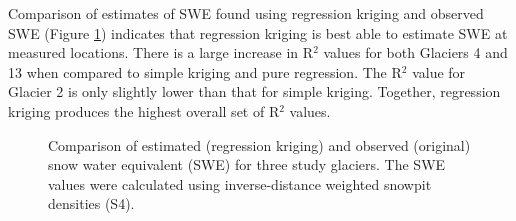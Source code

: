\documentclass[12pt]{article}
\begin{document}
Comparison of estimates of SWE found using regression kriging and observed SWE (Figure \ref{fig:R2regressionkrig}) indicates that regression kriging is best able to estimate SWE at measured locations. There is a large increase in R$^2$ values for both Glaciers 4 and 13 when compared to simple kriging and pure regression. The R$^2$ value for Glacier 2 is only slightly lower than that for simple kriging. Together, regression kriging produces the highest overall set of R$^2$ values. 


\begin{figure}
	\caption{Comparison of estimated (regression kriging) and observed (original) snow water equivalent (SWE) for three study glaciers. The SWE values were calculated using inverse-distance weighted snowpit densities (S4).}
	\label{fig:R2regressionkrig}
\end{figure}




\end{document}
